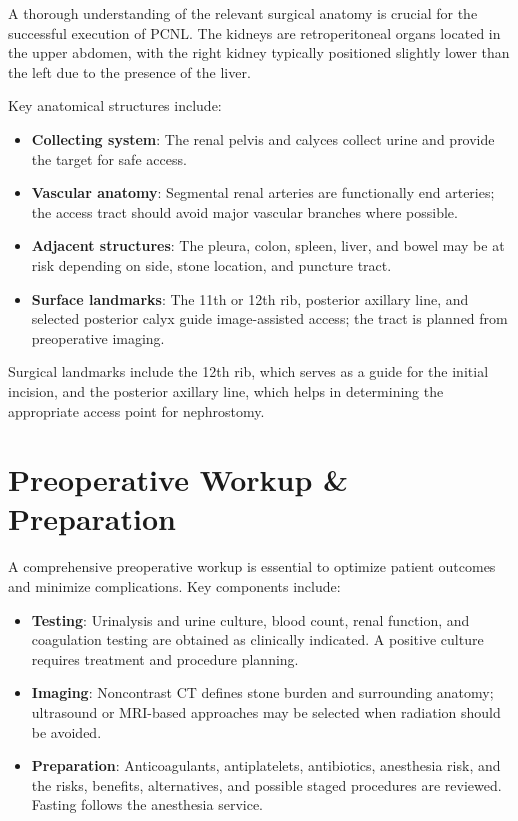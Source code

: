 A thorough understanding of the relevant surgical anatomy is crucial for the successful execution of PCNL. The kidneys are retroperitoneal organs located in the upper abdomen, with the right kidney typically positioned slightly lower than the left due to the presence of the liver.

Key anatomical structures include:

\begin{itemize}
  \item \textbf{Collecting system}: The renal pelvis and calyces collect urine and provide the target for safe access.
  \item \textbf{Vascular anatomy}: Segmental renal arteries are functionally end arteries; the access tract should avoid major vascular branches where possible.
  \item \textbf{Adjacent structures}: The pleura, colon, spleen, liver, and bowel may be at risk depending on side, stone location, and puncture tract.
  \item \textbf{Surface landmarks}: The 11th or 12th rib, posterior axillary line, and selected posterior calyx guide image-assisted access; the tract is planned from preoperative imaging.
\end{itemize}

Surgical landmarks include the 12th rib, which serves as a guide for the initial incision, and the posterior axillary line, which helps in determining the appropriate access point for nephrostomy.

\section*{Preoperative Workup \& Preparation}

A comprehensive preoperative workup is essential to optimize patient outcomes and minimize complications. Key components include:

\begin{itemize}
  \item \textbf{Testing}: Urinalysis and urine culture, blood count, renal function, and coagulation testing are obtained as clinically indicated. A positive culture requires treatment and procedure planning.
  \item \textbf{Imaging}: Noncontrast CT defines stone burden and surrounding anatomy; ultrasound or MRI-based approaches may be selected when radiation should be avoided.
  \item \textbf{Preparation}: Anticoagulants, antiplatelets, antibiotics, anesthesia risk, and the risks, benefits, alternatives, and possible staged procedures are reviewed. Fasting follows the anesthesia service.
\end{itemize}

